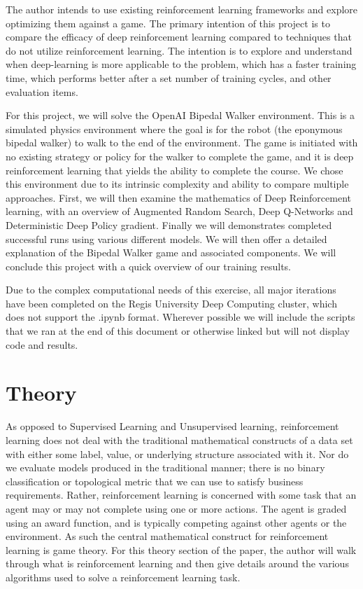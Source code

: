 \documentclass[doc, onecolumn, 12pt]{apa6}
\begin{document}
The author intends to use existing reinforcement learning frameworks and explore optimizing them against a game. The primary intention of this project is to compare the efficacy of deep reinforcement learning compared to techniques that do not utilize reinforcement learning. The intention is to explore and understand when deep-learning is more applicable to the problem, which has a faster training time, which performs better after a set number of training cycles, and other evaluation items. 

For this project, we will solve the OpenAI Bipedal Walker environment. This is a simulated physics environment where the goal is for the robot (the eponymous bipedal walker) to walk to the end of the environment. The game is initiated with no existing strategy or policy for the walker to complete the game, and it is deep reinforcement learning that yields the ability to complete the course. We chose this environment due to its intrinsic complexity and ability to compare multiple approaches. First, we will then examine the mathematics of Deep Reinforcement learning, with an overview of Augmented Random Search, Deep Q-Networks and Deterministic Deep Policy gradient. Finally we will demonstrates completed successful runs using various different models. We will then offer a detailed explanation of the Bipedal Walker game and associated components. We will conclude this project with a quick overview of our training results. 

Due to the complex computational needs of this exercise, all major iterations have been completed on the Regis University Deep Computing cluster, which does not support the .ipynb format. Wherever possible we will include the scripts that we ran at the end of this document or otherwise linked but will not display code and results.


\section{Theory}
As opposed to Supervised Learning and Unsupervised learning, reinforcement learning does not deal with the traditional mathematical constructs of a data set with either some label, value, or underlying structure associated with it. Nor do we evaluate models produced in the traditional manner; there is no binary classification or topological metric that we can use to satisfy business requirements. Rather, reinforcement learning is concerned with some task that an agent may or may not complete using one or more actions. The agent is graded using an award function, and is typically competing against other agents or the environment. As such the central mathematical construct for reinforcement learning is game theory. For this theory section of the paper, the author will walk through what is reinforcement learning and then give details around the various algorithms used to solve a reinforcement learning task. 
\end{document}
